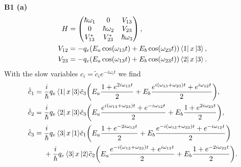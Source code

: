 \documentclass{article}
\makeatletter
\newcommand*{\shifttext}[1]{%
  \settowidth{\@tempdima}{#1}%
  \hspace{-\@tempdima}#1%
}
\newcommand{\plabel}[1]{%
\shifttext{\textbf{#1}\quad}%
}
\newcommand{\prule}{%
\begin{center}%
\hdashrule[0.5ex]{.99\linewidth}{1pt}{1pt 2.5pt}%
\end{center}%
}
\newcommand{\minusbaseline}{\abovedisplayskip=0pt\abovedisplayshortskip=0pt~\vspace*{-\baselineskip}}%
\makeatother
\begin{document}
\prule

\plabel{B1 (a)}%
\begingroup\minusbaseline
\begin{align*}
    H &= \begin{pmatrix*}
        \hbar\omega_1 & 0 & V_{13} \\
        0 & \hbar\omega_2 & V_{23} \\
        V^*_{13} & V^*_{23} & \hbar\omega_3
    \end{pmatrix*}, \\
    V_{12} &= -q_e(E_a \cos (\omega_{13}t) + E_b \cos(\omega_{23}t))\bra{1} x \ket{3}, \\
    V_{23} &= -q_e(E_a \cos (\omega_{13}t) + E_b \cos(\omega_{23}t))\bra{2} x \ket{3}.
\end{align*}
\endgroup
With the slow variables $c_i = \tilde{c}_i e^{-i\omega_i t}$ we find
\begin{align*}
    \dot{\tilde{c}}_1 &= \frac{i}{\hbar} {q_e \bra{1} x \ket{3}} \tilde{c}_3\qty(E_a \frac{1+e^{2i\omega_{13}t}}{2} + E_b \frac{e^{i(\omega_{13}+\omega_{23})t} + e^{i\omega_{12}t}}{2}), \\
    \dot{\tilde{c}}_2 &= \frac{i}{\hbar}{q_e \bra{2} x \ket{3}} \tilde{c}_3 \qty(E_a \frac{e^{i(\omega_{13}+\omega_{23})t} + e^{-i\omega_{12}t}}{2} + E_b \frac{1+e^{2i\omega_{23}t}}{2}), \\
    \dot{\tilde{c}}_3 &= \frac{i}{\hbar} {q_e \bra{3} x \ket{1}} \tilde{c}_1 \qty(E_a \frac{1+e^{-2i\omega_{13}t}}{2} + E_b \frac{e^{-i(\omega_{13}+\omega_{23})t} + e^{-i\omega_{12}t}}{2}) \\
    &{\phantom{{}={}}} + \frac{i}{\hbar}{q_e \bra{3} x \ket{2}} \tilde{c}_2 \qty(E_a \frac{e^{-i(\omega_{13}+\omega_{23})t} + e^{i\omega_{12}t}}{2} + E_b \frac{1+e^{-2i\omega_{23}t}}{2}).
\end{align*}
\end{document}
